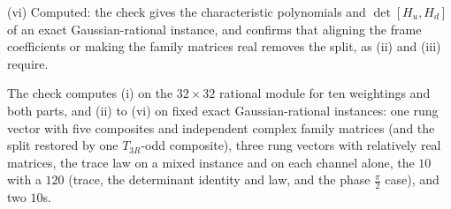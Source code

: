 (vi) Computed: the check gives the characteristic polynomials and $\det[H_{u}, H_{d}]$ of an exact Gaussian-rational instance, and confirms that aligning the frame coefficients or making the family matrices real removes the split, as (ii) and (iii) require.

The check computes (i) on the $32 \times 32$ rational module for ten weightings and both parts, and (ii) to (vi) on fixed exact Gaussian-rational instances: one rung vector with five composites and independent complex family matrices (and the split restored by one $T_{3R}$-odd composite), three rung vectors with relatively real matrices, the trace law on a mixed instance and on each channel alone, the $10$ with a $120$ (trace, the determinant identity and law, and the phase $\tfrac{\pi}{2}$ case), and two $10$s.
